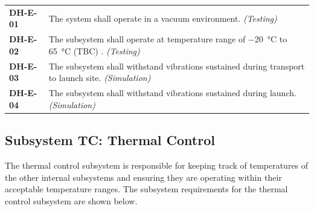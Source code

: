 \documentclass[12pt, letterpaper]{article}
\begin{document}
\vspace{-10pt}
\begin{longtable}{P{2cm}P{13.75cm}}
\textbf{DH-E-01}	& The system shall operate in a vacuum environment. \textit{(Testing)}													\\
\textbf{DH-E-02}	& The subsystem shall operate at temperature range of \SI{-20}{\degreeCelsius} to \SI{65}{\degreeCelsius} (TBC) \cite{NASAsysreq_Kumar}. \textit{(Testing)}										\\
\textbf{DH-E-03}	& The subsystem shall withstand vibrations sustained during transport to launch site. \textit{(Simulation)}		\\
\textbf{DH-E-04}	& The subsystem shall withstand vibrations sustained during launch. \textit{(Simulation)}						\\
\end{longtable}

\subsection{Subsystem TC: Thermal Control}
The thermal control subsystem is responsible for keeping track of temperatures of the other internal subsystems and ensuring they are operating within their acceptable temperature ranges. The subsystem requirements for the thermal control subsystem are shown below.
\end{document}

